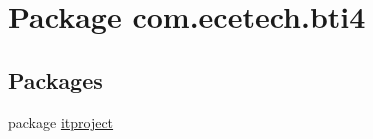 \hypertarget{namespacecom_1_1ecetech_1_1bti4}{}\section{Package com.\+ecetech.\+bti4}
\label{namespacecom_1_1ecetech_1_1bti4}
\subsection*{Packages}
\begin{DoxyCompactItemize}
\item 
package \hyperlink{namespacecom_1_1ecetech_1_1bti4_1_1itproject}{itproject}
\end{DoxyCompactItemize}
